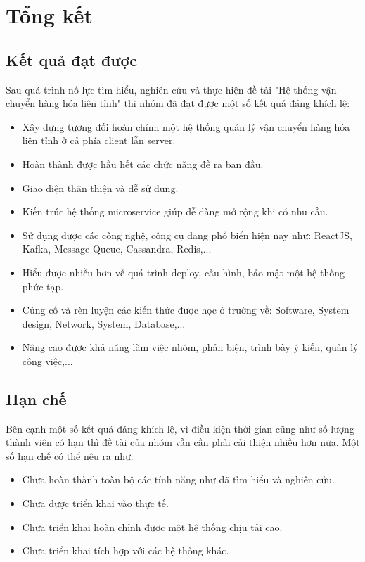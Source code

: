 \chapter{Tổng kết}\label{chap:result}
	\section{Kết quả đạt được}
	Sau quá trình nố lực tìm hiểu, nghiên cứu và thực hiện đề tài "Hệ thống vận chuyển hàng hóa liên tỉnh" thì nhóm đã đạt được một số kết quả đáng khích lệ:
	
	\begin{itemize}
		\item Xây dựng tương đối hoàn chỉnh một hệ thống quản lý vận chuyển hàng hóa liên tỉnh ở cả phía client lẫn server.
		\item Hoàn thành được hầu hết các chức năng đề ra ban đầu.
		\item Giao diện thân thiện và dễ sử dụng.
		\item Kiến trúc hệ thống microservice giúp dễ dàng mở rộng khi có nhu cầu.
		\item Sử dụng được các công nghệ, công cụ đang phổ biển hiện nay như: ReactJS, Kafka, Message Queue, Cassandra, Redis,... 
		\item Hiểu được nhiều hơn về quá trình deploy, cấu hình, bảo mật một hệ thống phức tạp.
		\item Củng cố và rèn luyện các kiến thức được học ở trường về: Software, System design, Network, System, Database,...
		\item Nâng cao được khả năng làm việc nhóm, phản biện, trình bày ý kiến, quản lý công việc,...
	\end{itemize} 
	
	
	\section{Hạn chế}
	
	Bên cạnh một số kết quả đáng khích lệ, vì điều kiện thời gian cũng như số lượng thành viên có hạn thì đề tài của nhóm vẫn cần phải cải thiện nhiều hơn nữa. Một số hạn chế có thể nêu ra như:


	\begin{itemize}
		\item Chưa hoàn thành toàn bộ các tính năng như đã tìm hiểu và nghiên cứu.
		\item Chưa được triển khai vào thực tế.
		\item Chưa triển khai hoàn chỉnh được một hệ thống chịu tải cao.
		\item Chưa triển khai tích hợp với các hệ thống khác.
	\end{itemize}
	

